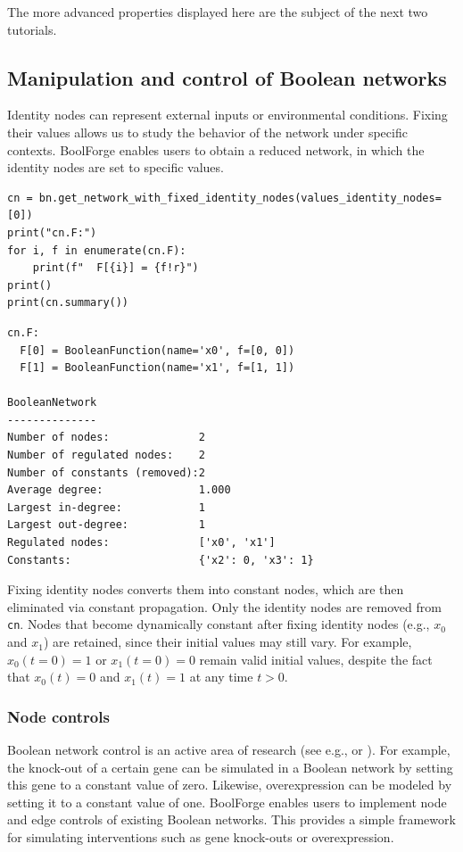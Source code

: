 \documentclass[
]{article}
\begin{document}
The more advanced properties displayed here are the subject of the next
two tutorials.

\subsection{Manipulation and control of Boolean
networks}\label{manipulation-and-control-of-boolean-networks}

Identity nodes can represent external inputs or environmental
conditions. Fixing their values allows us to study the behavior of the
network under specific contexts. BoolForge enables users to obtain a
reduced network, in which the identity nodes are set to specific values.

\begin{lstlisting}
cn = bn.get_network_with_fixed_identity_nodes(values_identity_nodes=[0])
print("cn.F:")
for i, f in enumerate(cn.F):
    print(f"  F[{i}] = {f!r}")
print()
print(cn.summary())
\end{lstlisting}

\begin{lstlisting}
cn.F:
  F[0] = BooleanFunction(name='x0', f=[0, 0])
  F[1] = BooleanFunction(name='x1', f=[1, 1])

BooleanNetwork
--------------
Number of nodes:              2
Number of regulated nodes:    2
Number of constants (removed):2
Average degree:               1.000
Largest in-degree:            1
Largest out-degree:           1
Regulated nodes:              ['x0', 'x1']
Constants:                    {'x2': 0, 'x3': 1}
\end{lstlisting}

Fixing identity nodes converts them into constant nodes, which are then
eliminated via constant propagation. Only the identity nodes are removed
from \texttt{cn}. Nodes that become dynamically constant after fixing
identity nodes (e.g., \(x_0\) and \(x_1\)) are retained, since their
initial values may still vary. For example, \(x_0(t=0) = 1\) or
\(x_1(t=0) = 0\) remain valid initial values, despite the fact that
\(x_0(t) = 0\) and \(x_1(t) = 1\) at any time \(t>0\).

\subsubsection{Node controls}\label{node-controls}

Boolean network control is an active area of research (see e.g.,
\citet{murrugarra2016identification} or \citet{borriello2021basis}). For
example, the knock-out of a certain gene can be simulated in a Boolean
network by setting this gene to a constant value of zero. Likewise,
overexpression can be modeled by setting it to a constant value of one.
BoolForge enables users to implement node and edge controls of existing
Boolean networks. This provides a simple framework for simulating
interventions such as gene knock-outs or overexpression.
\end{document}
